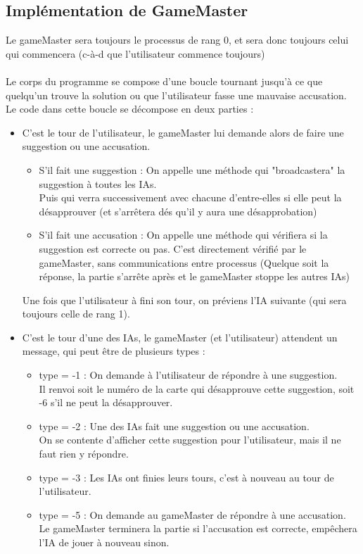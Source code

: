 \documentclass[a4paper,10pt]{article}
\begin{document}
	\subsection{Implémentation de GameMaster}
		Le gameMaster sera toujours le processus de rang 0, et sera donc toujours celui qui commencera (c-à-d que l'utilisateur commence toujours)\\
		\\
		Le corps du programme se compose d'une boucle tournant jusqu'à ce que quelqu'un trouve la solution ou que l'utilisateur fasse une mauvaise accusation.
		Le code dans cette boucle se décompose en deux parties :
		\begin{itemize}
			\item C'est le tour de l'utilisateur, le gameMaster lui demande alors de faire une suggestion ou une accusation.
				\begin{itemize}
					\item S'il fait une suggestion : On appelle une méthode qui "broadcastera" la suggestion à toutes les IAs.\\
						 Puis qui verra successivement avec chacune d'entre-elles si elle peut la désapprouver (et s'arrêtera dés qu'il y aura une désapprobation)
					\item S'il fait une accusation : On appelle une méthode qui vérifiera si la suggestion est correcte ou pas.
							C'est directement vérifié par le gameMaster, sans communications entre processus (Quelque soit la réponse, la partie s'arrête après et le gameMaster stoppe les autres IAs)
				\end{itemize}
				Une fois que l'utilisateur à fini son tour, on préviens l'IA suivante (qui sera toujours celle de rang 1).
			\item C'est le tour d'une des IAs, le gameMaster (et l'utilisateur) attendent un message, qui peut être de plusieurs types :
				\begin{itemize}
					\item type = -1 : On demande à l'utilisateur de répondre à une suggestion.\\
								Il renvoi soit le numéro de la carte qui désapprouve cette suggestion, soit -6 s'il ne peut la désapprouver.
					\item type = -2 : Une des IAs fait une suggestion ou une accusation.\\
								On se contente d'afficher cette suggestion pour l'utilisateur, mais il ne faut rien y répondre.
					\item type = -3 : Les IAs ont finies leurs tours, c'est à nouveau au tour de l'utilisateur.
					\item type = -5 : On demande au gameMaster de répondre à une accusation.\\
								Le gameMaster terminera la partie si l'accusation est correcte, empêchera l'IA de jouer à nouveau sinon.
				\end{itemize}
		\end{itemize}
	
\end{document}
